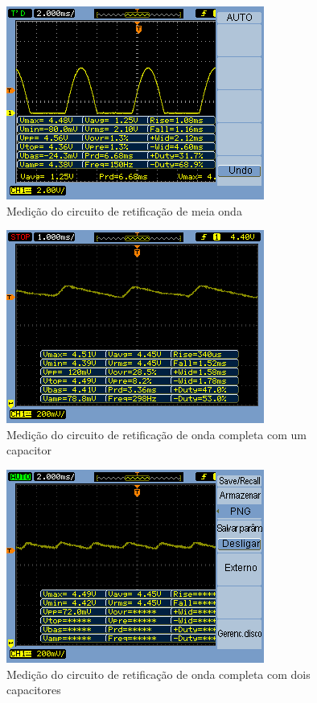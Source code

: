 \begin{figure}[!ht]

\includegraphics[width=0.5\linewidth]{0011.png}
\caption{Medição do circuito de retificação de meia onda}
\label{meia-osc}
\end{figure} 



\begin{figure}[!ht]

\includegraphics[width=0.5\linewidth]{0021.png}
\caption{Medição do circuito de retificação de onda completa com um capacitor}
\label{completa-1-osc}
\end{figure} 

\begin{figure}[!ht]
\includegraphics[width=0.5\linewidth]{0022.png}
\caption{Medição do circuito de retificação de onda completa com dois capacitores}
\label{completa-2-osc}
\end{figure} 

